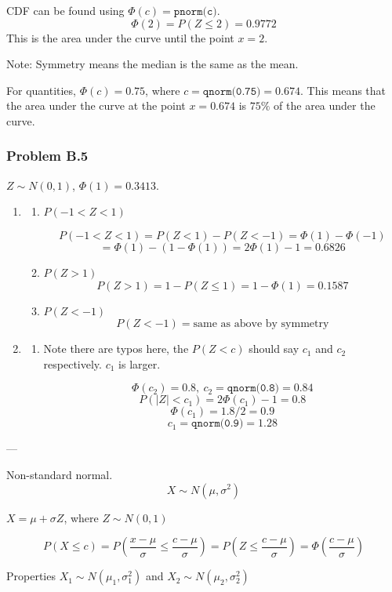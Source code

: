 \documentclass{report}
\newcommand{\var}{\sigma^2}
\begin{document}
CDF can be found using $\Phi(c) = \texttt{pnorm(c)}$.
$$\Phi(2) = P(Z \leq 2) = 0.9772$$ This is the area under the curve until the point $x=2$.

Note: Symmetry means the median is the same as the mean.

For quantities, $\Phi(c) = 0.75$, where $c=\texttt{qnorm(0.75)}=0.674$. This means that the area under the curve at the point $x=0.674$ is $75\%$ of the area under the curve.

\subsubsection*{Problem B.5}

$Z \sim N(0,1)$, $\Phi(1)=0.3413$.

\begin{enumerate}
\item \begin{enumerate}
\item $P(-1 < Z < 1)$ 

$$P(-1 < Z < 1) = P(Z < 1) - P(Z < -1) = \Phi(1) - \Phi(-1) $$ $$ = \Phi(1) - (1-\Phi(1)) = 2\Phi(1) - 1 = 0.6826$$
\item $P(Z > 1)$
$$P(Z > 1) = 1-P(Z \leq 1) = 1-\Phi(1) = 0.1587$$
\item $P(Z < -1)$
$$ P(Z < -1) = \text{same as above by symmetry}$$

\end{enumerate}
\item \begin{enumerate} 
\item  Note there are typos here, the $P(Z<c)$ should say $c_1$ and $c_2$ respectively. $c_1$ is larger.

$$\Phi(c_2) = 0.8,\ c_2 = \texttt{qnorm(0.8)} = 0.84$$
$$P(|Z|<c_1) = 2\Phi(c_1) - 1 = 0.8$$
$$\Phi(c_1) = 1.8/2 = 0.9$$
$$c_1 = \texttt{qnorm(0.9)} = 1.28$$


\end{enumerate}
\end{enumerate}

---

Non-standard normal. $$ X \sim N(\mu, \var)$$

$X = \mu + \sigma Z$, where $Z \sim N(0,1)$

$$P(X \leq c) = P(\frac{x-\mu}{\sigma} \leq \frac{c-\mu}{\sigma} ) = P(Z \leq \frac{c-\mu}{\sigma}) = \Phi(\frac{c-\mu}{\sigma})$$

Properties $X_1 \sim N(\mu_1, \var_1)$ and $X_2 \sim N(\mu_2, \var_2) $
\end{document}
